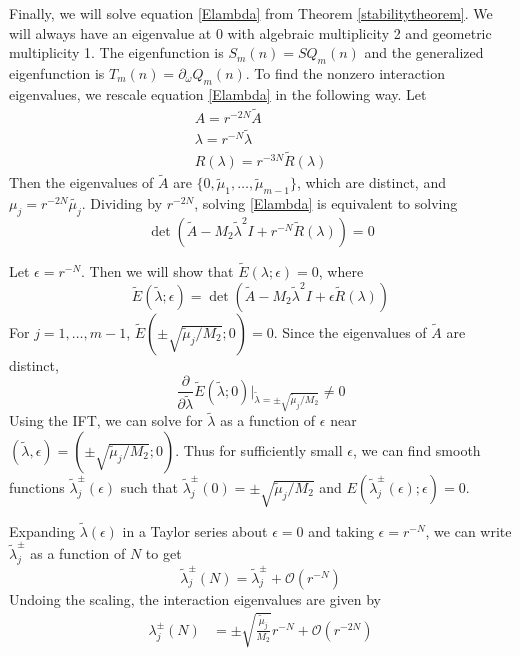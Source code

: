 \documentclass[12pt]{article}
\begin{document}
Finally, we will solve equation \eqref{Elambda} from Theorem \ref{stabilitytheorem}. We will always have an eigenvalue at 0 with algebraic multiplicity 2 and geometric multiplicity 1. The eigenfunction is $S_m(n) = S Q_m(n)$ and the generalized eigenfunction is $T_m(n) = \partial_\omega Q_m(n)$. To find the nonzero interaction eigenvalues, we rescale equation \eqref{Elambda} in the following way. Let
\begin{align*}
A = r^{-2N} \tilde{A} \\
\lambda = r^{-N} \tilde{\lambda} \\
R(\lambda) = r^{-3N} \tilde{R}(\lambda)
\end{align*}
Then the eigenvalues of $\tilde{A}$ are $\{0, \tilde{\mu}_1, \dots, \tilde{\mu}_{m-1}\}$, which are distinct, and $\mu_j = r^{-2N} \tilde{\mu_j}$. Dividing by $r^{-2N}$, solving \eqref{Elambda} is equivalent to solving
\[
\det(\tilde{A} - M_2 \tilde{\lambda}^2 I + r^{-N} \tilde{R}(\lambda)) = 0
\]

Let $\epsilon = r^{-N}$. Then we will show that $\tilde{E}(\lambda; \epsilon) = 0$, where
\begin{equation}\label{deftildeE}
\tilde{E}(\tilde{\lambda}; \epsilon) = \det(\tilde{A} - M_2 \tilde{\lambda}^2 I + \epsilon \tilde{R}(\lambda))
\end{equation}
For $j = 1, \dots, m-1$, $\tilde{E}(\pm \sqrt{\tilde{\mu}_j / M_2 }; 0) = 0$. Since the eigenvalues of $\tilde{A}$ are distinct, 
\[
\frac{\partial}{\partial \tilde{\lambda}} \tilde{E}(\tilde{\lambda}; 0)\Big|_{\tilde{\lambda} = \pm \sqrt{\tilde{\mu}_j / M_2 }} \neq 0
\]
Using the IFT, we can solve for $\tilde{\lambda}$ as a function of $\epsilon$ near $(\tilde{\lambda}, \epsilon) = (\pm \sqrt{\tilde{\mu}_j / M_2 }; 0)$. Thus for sufficiently small $\epsilon$, we can find smooth functions $\tilde{\lambda}_j^\pm(\epsilon)$ such that $\tilde{\lambda}_j^\pm(0) = \pm \sqrt{\tilde{\mu}_j / M_2 }$ and $E(\tilde{\lambda}_j^\pm(\epsilon); \epsilon) = 0$. 

Expanding $\tilde{\lambda}(\epsilon)$ in a Taylor series about $\epsilon = 0$ and taking $\epsilon = r^{-N}$, we can write $\tilde{\lambda}_j^\pm$ as a function of $N$ to get 
\begin{equation*}
\tilde{\lambda}_j^\pm(N) = \tilde{\lambda}_j^\pm + \mathcal{O}(r^{-N})
\end{equation*}
Undoing the scaling, the interaction eigenvalues are given by
\begin{align*}
\lambda^\pm_j(N) &= \pm \sqrt{\frac{\tilde{\mu}_j}{M_2}}  r^{-N}  + \mathcal{O}(r^{-2N}) 
\end{align*}
\end{document}
